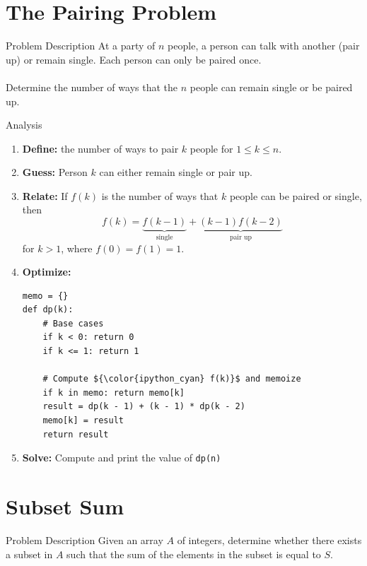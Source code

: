 \documentclass{cspresentation}
\begin{document}
\section{The Pairing Problem}
\begin{frame}{Problem Description}
    At a party of $n$ people, a person can talk with another (pair up) or remain single. Each person can only be paired once.\\~\\
    Determine the number of ways that the $n$ people can remain single or be paired up.
\end{frame}

\begin{frame}{Analysis}
    \begin{enumerate}
        \item \textbf{Define:} the number of ways to pair $k$ people for $1 \leq k \leq n$.
        \item \textbf{Guess:} Person $k$ can either remain single or pair up.
        \item \textbf{Relate:} If $f(k)$ is the number of ways that $k$ people can be paired or single, then $$f(k)=\underbrace{f(k-1)}_{\text{single}}+\underbrace{(k-1)f(k-2)}_{\text{pair up}}$$ for $k>1$, where $f(0)=f(1)=1$.
        \framebreak
        \item \textbf{Optimize:}
\begin{lstlisting}[language=iPython,mathescape=true]
memo = {}
def dp(k):
    # Base cases
    if k < 0: return 0
    if k <= 1: return 1
    
    # Compute ${\color{ipython_cyan} f(k)}$ and memoize
    if k in memo: return memo[k]
    result = dp(k - 1) + (k - 1) * dp(k - 2)
    memo[k] = result
    return result
\end{lstlisting}
    \item \textbf{Solve:} Compute and print the value of \lstinline[language=iPython]!dp(n)!
    \end{enumerate}
\end{frame}

\section{Subset Sum}
\begin{frame}{Problem Description} 
    Given an array $A$ of integers, determine whether there exists a subset in $A$ such that the sum of the elements in the subset is equal to $S$.
\end{frame}
\end{document}
